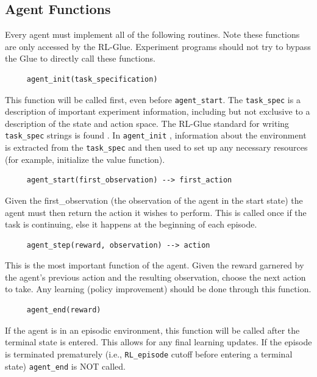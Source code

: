 \documentclass[11pt]{article}
\begin{document}
\subsection{Agent Functions}
 
Every agent must implement all of the following routines. Note these functions are only accessed by the RL-Glue. Experiment programs should not try to bypass the Glue to directly call these functions.

\begin{verbatim}
     agent_init(task_specification)
\end{verbatim}     
This function will be called first, even before \texttt{agent\_start}. The \texttt{task\_spec} is a description of important experiment information, including but not exclusive to a description of the state and action space. The RL-Glue standard for writing \texttt{task\_spec} strings is found .  In \texttt{agent\_init} , information about the environment is extracted from the \texttt{task\_spec} and then used to set up any necessary resources (for example, initialize the value function).

\begin{verbatim}
     agent_start(first_observation) --> first_action
\end{verbatim}
Given the first\_observation (the observation of the agent in the start state) the agent must then return the action it wishes to perform. This is called once if the task is continuing, else it happens at the beginning of each episode.

\begin{verbatim}
     agent_step(reward, observation) --> action
\end{verbatim}
This is the most important function of the agent. Given the reward garnered by the agent's previous action and the resulting observation, choose the next action to take. Any learning (policy improvement) should be done through this function.

\begin{verbatim}
     agent_end(reward)
\end{verbatim}     
If the agent is in an episodic environment, this function will be called after the terminal state is entered. This allows for any final learning updates. If the episode is terminated prematurely (i.e., \texttt{RL\_episode} cutoff before entering a terminal state) \texttt{agent\_end} is NOT called.
\end{document}
